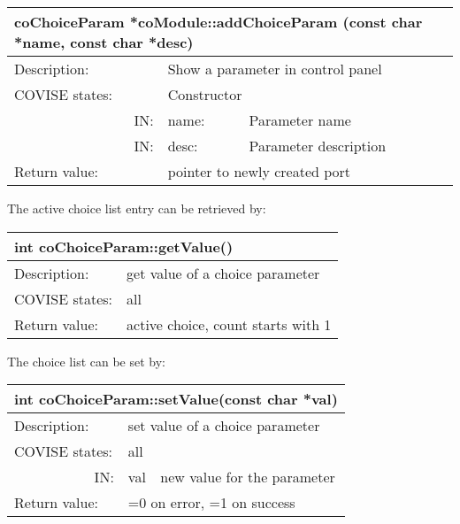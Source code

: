 \begin{longtable}{|p{4cm}|p{2.5cm}|p{7cm}|}
\hline
\multicolumn{3}{|p{13.5cm}|}{\bf coChoiceParam *coModule::addChoiceParam 
                           (const char *name, const char *desc)} \\
\hline
{Description:}   
                        & \multicolumn{2}{|p{9.5cm}|}{Show a parameter in control panel} \\
\hline
{COVISE states:} & \multicolumn{2}{|p{9.5cm}|}{Constructor} \\
\hline
\multicolumn{1}{|r|}{IN:} & {name:} 
                             & {Parameter name}\\
\hline
\multicolumn{1}{|r|}{IN:} & {desc:} 
                            & {Parameter description}\\
\hline
{Return value:}  
                        & \multicolumn{2}{|p{9.5cm}|}{pointer to newly created port} \endhead
\hline
\end{longtable}

The active choice list entry can be retrieved by:

\begin{longtable}{|p{4cm}|p{10cm}|}
\hline
\multicolumn{2}{|p{13.5cm}|}{\bf int coChoiceParam::getValue()}\\
\hline
{Description:}   
                   & {get value of a choice parameter} \\
\hline
{COVISE states:} & {all} \\
\hline
{Return value:}  
               & {active choice, count starts with 1} \endhead
\hline
\end{longtable}

The choice list can be set by:

\begin{longtable}{|p{4cm}|p{2.5cm}|p{7cm}|}
\hline
\multicolumn{3}{|p{13.5cm}|}{\bf int coChoiceParam::setValue(const char *val)}\\
\hline
{Description:}   
                   & \multicolumn{2}{|p{9.5cm}|}{set value of a choice parameter} \\
\hline
{COVISE states:} & \multicolumn{2}{|p{9.5cm}|}{all} \\
\hline
\multicolumn{1}{|r|}{IN:} & {val} 
                     & {new value for the parameter}\\
\hline
{Return value:}  
                        & \multicolumn{2}{|p{9.5cm}|}{=0 on error, =1 on success} \endhead
\hline
\end{longtable}

